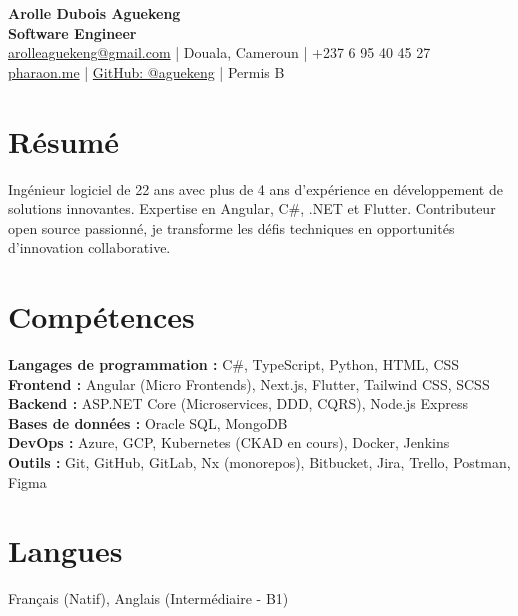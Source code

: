 \documentclass[a4paper,10pt]{article}
\begin{document}
\begin{center}
    {\LARGE \textbf{Arolle Dubois Aguekeng}}\\
    \vspace{0.2cm}
    \textbf{Software Engineer}\\
    \vspace{0.3cm}
    \href{mailto:arolleaguekeng@gmail.com}{arolleaguekeng@gmail.com} | Douala, Cameroun | +237 6 95 40 45 27\\
    \href{https://pharaon.me}{pharaon.me} | \href{https://github.com/arolleaguekeng}{GitHub: @aguekeng} | Permis B
\end{center}

\section*{Résumé}
Ingénieur logiciel de 22 ans avec plus de 4 ans d'expérience en développement de solutions innovantes. Expertise en Angular, C\#, .NET et Flutter. Contributeur open source passionné, je transforme les défis techniques en opportunités d'innovation collaborative.

\section*{Compétences}
\textbf{Langages de programmation :} C\#, TypeScript, Python, HTML, CSS\\
\textbf{Frontend :} Angular (Micro Frontends), Next.js, Flutter, Tailwind CSS, SCSS\\
\textbf{Backend :} ASP.NET Core (Microservices, DDD, CQRS), Node.js Express\\
\textbf{Bases de données :} Oracle SQL, MongoDB\\
\textbf{DevOps :} Azure, GCP, Kubernetes (CKAD en cours), Docker, Jenkins\\
\textbf{Outils :} Git, GitHub, GitLab, Nx (monorepos), Bitbucket, Jira, Trello, Postman, Figma

\section*{Langues}
Français (Natif), Anglais (Intermédiaire - B1)

\end{document}
